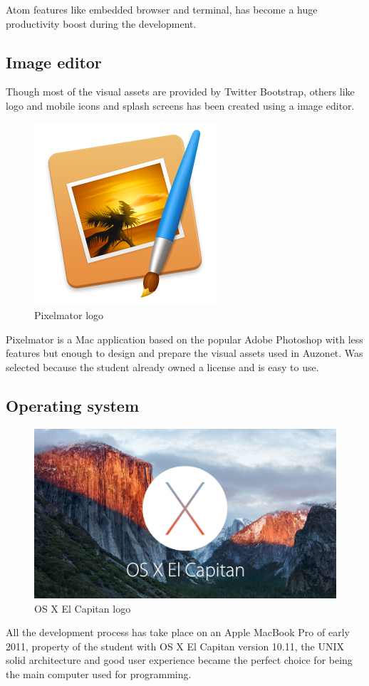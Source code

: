 \documentclass{DeustoFDP}
\begin{document}
Atom features like embedded browser and terminal, has become a huge productivity boost during the development.
\subsection{Image editor}
Though most of the visual assets are provided by Twitter Bootstrap, others like logo and mobile icons and splash screens has been created using a image editor.

\begin{figure}[h]
\centering
\includegraphics[width=0.3\linewidth]{fig/pixelmator}
\caption[Pixelmator logo]{Pixelmator logo}
\label{fig:pixelmator}
\end{figure}


Pixelmator is a Mac application based on the popular Adobe Photoshop with less features but enough to design and prepare the visual assets used in Auzonet. Was selected because the student already owned a license and is easy to use.

\subsection{Operating system}
\begin{figure}[h]
\centering
\includegraphics[width=0.7\linewidth]{fig/osxelcapitan}
\caption[OS X El Capitan logo]{OS X El Capitan logo}
\label{fig:osxelcapitan}
\end{figure}


All the development process has take place on an Apple MacBook Pro of early 2011, property of the student with OS X El Capitan version 10.11, the UNIX solid architecture and good user experience became the perfect choice for being the main computer used for programming.
\end{document}
